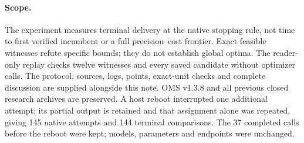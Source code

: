 \documentclass[11pt]{article}
\begin{document}
\paragraph{Scope.}
The experiment measures terminal delivery at the native stopping rule, not time
to first verified incumbent or a full precision--cost frontier. Exact feasible
witnesses refute specific bounds; they do not establish global optima. The
reader-only replay checks twelve witnesses and every saved candidate without
optimizer calls. The protocol, sources, logs, points, exact-unit checks and
complete discussion are supplied alongside this note. OMS v1.3.8 and all previous
closed research archives are preserved. A host reboot interrupted one additional
attempt; its partial output is retained and that assignment alone was repeated,
giving 145 native attempts and 144 terminal comparisons. The 37 completed calls
before the reboot were kept; models, parameters and endpoints were unchanged.
\end{document}
